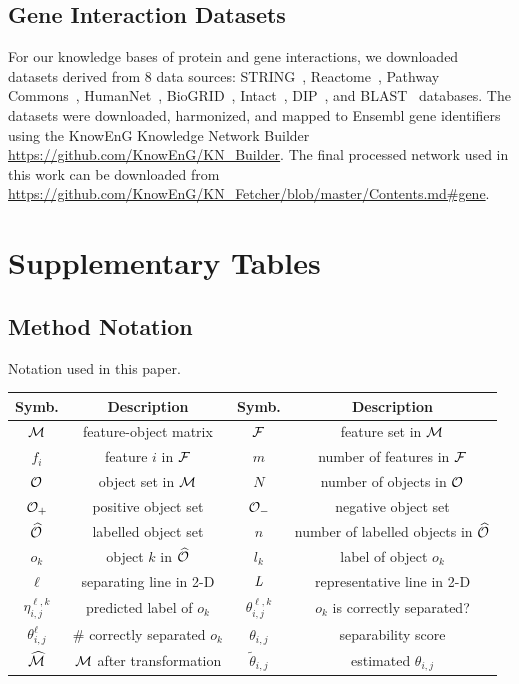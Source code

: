 \subsection{Gene Interaction Datasets} \label{app:relation_data}
For our knowledge bases of protein and gene interactions, we downloaded datasets derived from 8 data sources:
STRING~, Reactome~, Pathway Commons~,
HumanNet~, BioGRID~, Intact~,
DIP~, and BLAST~ databases. 
The datasets were downloaded, harmonized, and mapped to Ensembl gene identifiers using the 
KnowEnG Knowledge Network Builder \url{https://github.com/KnowEnG/KN_Builder}. 
The final processed network used in this work can be downloaded from \url{https://github.com/KnowEnG/KN_Fetcher/blob/master/Contents.md#gene}.


\section{Supplementary Tables}

\subsection{\genviz Method Notation}\label{appT:notation}
Notation used in this paper.
\begin{table}[h]
\centering
\vspace{-5mm}
\small
\begin{tabular}{|c|c|c|c|}
 \hline
 Symb. & Description & Symb. & Description\\
 \hline
 \hline
 ${\mathcal{M}}$ & feature-object matrix & ${\mathcal{F}}$ & feature set in ${\mathcal{M}}$ \\
 \hline
 $f_i$ & feature $i$ in ${\mathcal{F}}$ & $m$ & number of features in ${\mathcal{F}}$\\
 \hline
 ${\mathcal{O}}$ & object set in ${\mathcal{M}}$ & $N$ & number of objects in ${\mathcal{O}}$\\
 \hline
 ${\mathcal{O}}_+$ & positive object set & ${\mathcal{O}}_-$ & negative object set\\
 \hline
 $\widehat{{\mathcal{O}}}$ & labelled object set & $n$ & number of labelled objects in $\widehat{{\mathcal{O}}}$\\
 \hline
 $o_k$ & object $k$ in $\widehat{{\mathcal{O}}}$ & $l_k$ & label of object $o_k$\\
 \hline
 $\ell$ & separating line in 2-D & $\mathit{L}$ & representative line in 2-D\\
 \hline
 $\eta_{i,j}^{\ell,k}$ & predicted label of $o_k$ & $\theta_{i,j}^{\ell,k}$ & $o_k$ is correctly separated? \\
 \hline
 $\theta_{i,j}^{\ell}$ & \# correctly separated $o_k$ & $\theta_{i,j}$ & separability score\\
 \hline
 $\widehat{{\mathcal{M}}}$ & ${\mathcal{M}}$ after transformation & $\tilde{\theta}_{i,j}$ & estimated $\theta_{i,j}$\\
 \hline
 \end{tabular}
\label{tbl:notation}
\vspace{-18pt}
\end{table}

